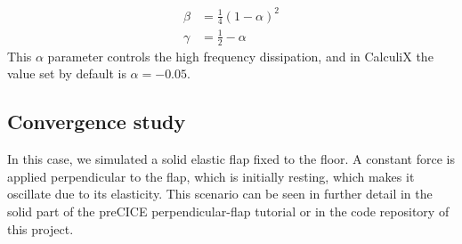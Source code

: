 \documentclass[
  english,        %
  font=times,     %
  onecolumn,      %
]{tumarticle}
\begin{document}
\begin{align}
    \beta &= \frac{1}{4}(1 - \alpha)^2 \\
    \gamma &= \frac{1}{2} - \alpha
\end{align}
This $\alpha$ parameter controls the high frequency dissipation, and in CalculiX the value set by default is $\alpha=-0.05$.

\subsection{Convergence study} \label{sec:convstudycalc}
In this case, we simulated a solid elastic flap fixed to the floor. A constant force is applied perpendicular to the flap, which is initially resting, which makes it oscillate due to its elasticity. This scenario can be seen in further detail in the solid part of the preCICE perpendicular-flap tutorial \cite{perpendicularFlap} or in the code repository of this project.
\end{document}
